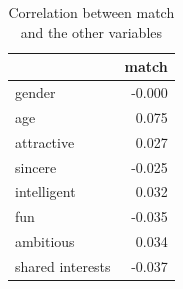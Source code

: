 \begin{table}[htbp]
\centering
\caption{Correlation between match and the other variables}
\label{tab:q7_correlation_match}
\begin{tabular}{lr}
\toprule
 & match \\
\midrule
gender & -0.000 \\
age & 0.075 \\
attractive & 0.027 \\
sincere & -0.025 \\
intelligent & 0.032 \\
fun & -0.035 \\
ambitious & 0.034 \\
shared interests & -0.037 \\
\bottomrule
\end{tabular}
\end{table}
